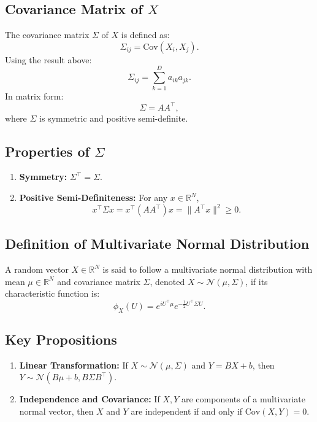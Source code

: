 \subsection{Covariance Matrix of \( X \)}
The covariance matrix \( \Sigma \) of \( X \) is defined as:
\[
\Sigma_{ij} = \text{Cov}(X_i, X_j).
\]
Using the result above:
\[
\Sigma_{ij} = \sum_{k=1}^D a_{ik} a_{jk}.
\]
In matrix form:
\[
\Sigma = A A^\top,
\]
where \( \Sigma \) is symmetric and positive semi-definite.

\subsection{Properties of \( \Sigma \)}
\begin{enumerate}
    \item \textbf{Symmetry:} \( \Sigma^\top = \Sigma \).
    \item \textbf{Positive Semi-Definiteness:} For any \( x \in \mathbb{R}^N \),
\[
x^\top \Sigma x = x^\top (A A^\top) x = \|A^\top x\|^2 \geq 0.
\]
\end{enumerate}

\subsection{Definition of Multivariate Normal Distribution}
A random vector \( X \in \mathbb{R}^N \) is said to follow a multivariate normal distribution with mean \( \mu \in \mathbb{R}^N \) and covariance matrix \( \Sigma \), denoted \( X \sim \mathcal{N}(\mu, \Sigma) \), if its characteristic function is:
\[
\phi_X(U) = e^{i U^\top \mu} e^{-\frac{1}{2} U^\top \Sigma U}.
\]

\subsection{Key Propositions}
\begin{enumerate}
    \item \textbf{Linear Transformation:} If \( X \sim \mathcal{N}(\mu, \Sigma) \) and \( Y = B X + b \), then \( Y \sim \mathcal{N}(B \mu + b, B \Sigma B^\top) \).
    \item \textbf{Independence and Covariance:} If \( X, Y \) are components of a multivariate normal vector, then \( X \) and \( Y \) are independent if and only if \( \text{Cov}(X, Y) = 0 \).
\end{enumerate}